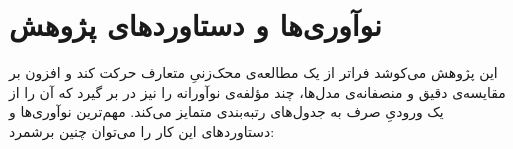 
\section{نوآوری‌ها و دستاوردهای پژوهش}

این پژوهش می‌کوشد فراتر از یک مطالعه‌ی محک‌زنیِ متعارف حرکت کند و افزون بر
مقایسه‌ی دقیق و منصفانه‌ی مدل‌ها، چند مؤلفه‌ی نوآورانه را نیز در بر گیرد که آن را
از یک ورودیِ صرف به جدول‌های رتبه‌بندی متمایز می‌کند. مهم‌ترین نوآوری‌ها و
دستاوردهای این کار را می‌توان چنین برشمرد:

